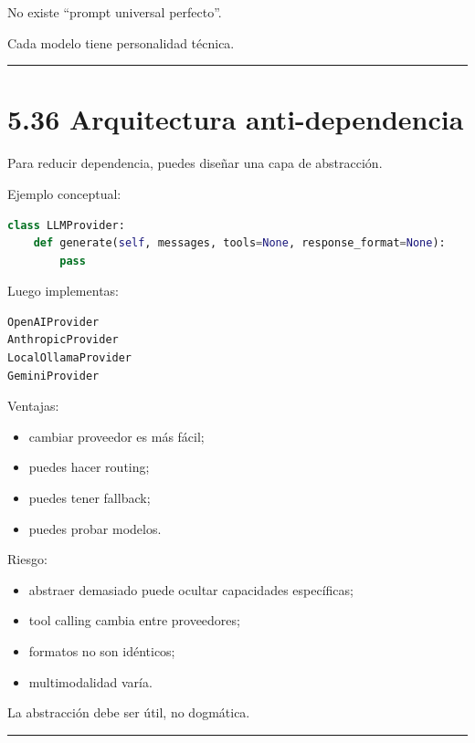 No existe ``prompt universal perfecto''.

Cada modelo tiene personalidad técnica.

\begin{center}\rule{0.5\linewidth}{0.5pt}\end{center}

\section{5.36 Arquitectura
anti-dependencia}\label{arquitectura-anti-dependencia}

Para reducir dependencia, puedes diseñar una capa de abstracción.

Ejemplo conceptual:

\begin{lstlisting}[language=Python]
class LLMProvider:
    def generate(self, messages, tools=None, response_format=None):
        pass
\end{lstlisting}

Luego implementas:

\begin{lstlisting}
OpenAIProvider
AnthropicProvider
LocalOllamaProvider
GeminiProvider
\end{lstlisting}

Ventajas:

\begin{itemize}
\tightlist
\item
  cambiar proveedor es más fácil;
\item
  puedes hacer routing;
\item
  puedes tener fallback;
\item
  puedes probar modelos.
\end{itemize}

Riesgo:

\begin{itemize}
\tightlist
\item
  abstraer demasiado puede ocultar capacidades específicas;
\item
  tool calling cambia entre proveedores;
\item
  formatos no son idénticos;
\item
  multimodalidad varía.
\end{itemize}

La abstracción debe ser útil, no dogmática.

\begin{center}\rule{0.5\linewidth}{0.5pt}\end{center}

